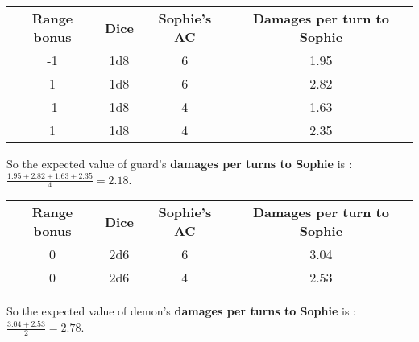 \begin{table}[H]
  \centering
  \begin{tabular}{|c|c|c|c|}
    \hline
    \rowcolor[HTML]{9B9B9B}
    \multicolumn{4}{|c|}{\cellcolor[HTML]{9B9B9B}{\color[HTML]{FFFFFF} \textbf{Guard}}} \\ \hline
    \rowcolor[HTML]{C0C0C0}
    \textbf{Range bonus} & \textbf{Dice} & \textbf{Sophie's AC} & \textbf{Damages per turn to Sophie} \\ \hline
    -1 & 1d8 & 6 & 1.95 \\ \hline
     1 & 1d8 & 6 & 2.82 \\ \hline
    -1 & 1d8 & 4 & 1.63\\ \hline
     1 & 1d8 & 4 & 2.35 \\ \hline
  \end{tabular}
\end{table}
So the expected value of guard's \textbf{damages per turns to Sophie} is :\\
$\frac{1.95+2.82+1.63+2.35}{4}=2.18$.\\

\begin{table}[H]
  \centering
  \begin{tabular}{|c|c|c|c|}
    \hline
    \rowcolor[HTML]{9B9B9B}
    \multicolumn{4}{|c|}{\cellcolor[HTML]{9B9B9B}{\color[HTML]{FFFFFF} \textbf{Demon}}} \\ \hline
    \rowcolor[HTML]{C0C0C0}
    \textbf{Range bonus} & \textbf{Dice} & \textbf{Sophie's AC} & \textbf{Damages per turn to Sophie} \\ \hline
    0 & 2d6 & 6 & 3.04 \\ \hline
    0 & 2d6 & 4 & 2.53 \\ \hline
  \end{tabular}
\end{table}
So the expected value of demon's \textbf{damages per turns to Sophie} is :\\
$\frac{3.04+2.53}{2}=2.78$.\\

